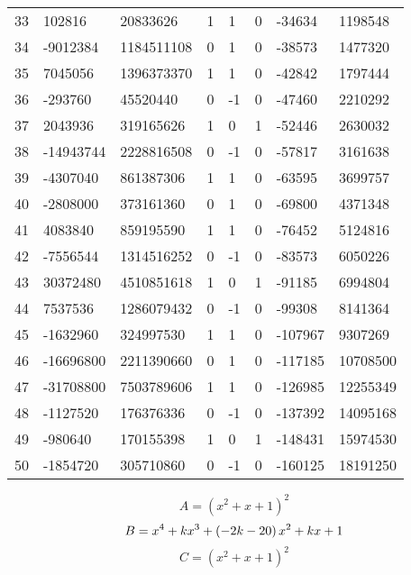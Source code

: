 \documentclass{amsart}
\begin{document}
\begin{longtable}{|l|l|l|lllll|}
33&102816&20833626&1&1&0&-34634&1198548\\
34&-9012384&1184511108&0&1&0&-38573&1477320\\
35&7045056&1396373370&1&1&0&-42842&1797444\\
36&-293760&45520440&0&-1&0&-47460&2210292\\
37&2043936&319165626&1&0&1&-52446&2630032\\
38&-14943744&2228816508&0&-1&0&-57817&3161638\\
39&-4307040&861387306&1&1&0&-63595&3699757\\
40&-2808000&373161360&0&1&0&-69800&4371348\\
41&4083840&859195590&1&1&0&-76452&5124816\\
42&-7556544&1314516252&0&-1&0&-83573&6050226\\
43&30372480&4510851618&1&0&1&-91185&6994804\\
44&7537536&1286079432&0&-1&0&-99308&8141364\\
45&-1632960&324997530&1&1&0&-107967&9307269\\
46&-16696800&2211390660&0&1&0&-117185&10708500\\
47&-31708800&7503789606&1&1&0&-126985&12255349\\
48&-1127520&176376336&0&-1&0&-137392&14095168\\
49&-980640&170155398&1&0&1&-148431&15974530\\
50&-1854720&305710860&0&-1&0&-160125&18191250\\
\hline
\end{longtable}
$$A=(x^2
 + x
 + 1)^{2}$$
$$B=x^4
 + k\*x^3
 + \left(-2\*k
 - 20\right) \*x^2
 + k\*x
 + 1$$
$$C=(x^2
 + x
 + 1)^{2}$$
\end{document}
